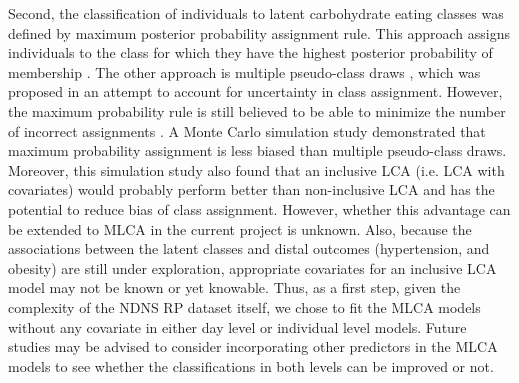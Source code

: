 Second, the classification of individuals to latent carbohydrate eating classes was defined by maximum posterior probability assignment rule. This approach assigns individuals to the class for which they have the highest posterior probability of membership \parencite{nagin2005group}. The other approach is multiple pseudo-class draws \parencite{wang2005residual}, which was proposed in an attempt to account for uncertainty in class assignment. However, the maximum probability rule is still believed to be able to minimize the number of incorrect assignments \parencite{goodman20071}. A Monte Carlo simulation study \parencite{bray2015eliminating} demonstrated that maximum probability assignment is less biased than multiple pseudo-class draws. Moreover, this simulation study also found that an inclusive LCA (i.e. LCA with covariates) would probably perform better than non-inclusive LCA and has the potential to reduce bias of class assignment. However, whether this advantage can be extended to MLCA in the current project is unknown.
Also, because the associations between the latent classes and distal outcomes (hypertension, and obesity) are still under exploration, appropriate covariates for an inclusive LCA model may not be known or yet knowable. Thus, as a first step, given the complexity of the NDNS RP dataset itself, we chose to fit the MLCA models without any covariate in either day level or individual level models. Future studies may be advised to consider incorporating other predictors in the MLCA models to see whether the classifications in both levels can be improved or not. 

